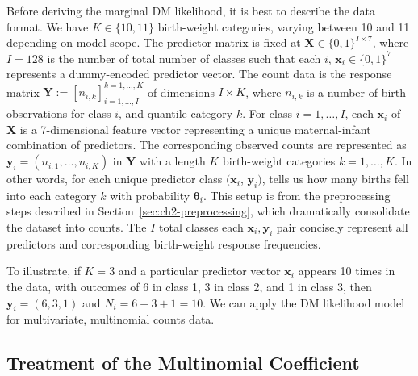 Before deriving the marginal DM likelihood, it is best to describe the data format. We have \(K\in\{10,11\}\) birth-weight categories, varying between 10 and 11 depending on model scope. The predictor matrix is fixed at \(\mathbf{X} \in \{0,1\}^{I \times 7}\), where \(I=128\) is the number of total number of classes such that each \(i\), \(\mathbf{x}_i \in \{0,1\}^7\) represents a dummy-encoded predictor vector. The count data is the response matrix \(\mathbf{Y} := [n_{i,k}]_{i=1,\dots,I}^{k = 1,\dots,K}\) of dimensions \(I \times K\), where \(n_{i,k}\) is a number of birth observations for class \(i\), and quantile category \(k\). For class \(i=1,\dots,I\), each \(\mathbf{x}_i\) of \(\mathbf{X}\) is a 7-dimensional feature vector representing a unique maternal-infant combination of predictors. The corresponding observed counts are represented as \(\mathbf{y}_i =(n_{i,1}, \dots, n_{i,K}) \) in \(\mathbf{Y}\) with a length \(K\) birth-weight categories \(k = 1, \dots, K\). In other words, for each unique predictor class \((\mathbf{x}_i\), \(\mathbf{y}_i)\), tells us how many births fell into each category \(k\) with probability \(\boldsymbol{\theta}_i\). This setup is from the preprocessing steps described in Section~\ref{sec:ch2-preprocessing}, which dramatically consolidate the dataset into counts. The \(I\) total classes each \(\mathbf{x}_i, \mathbf{y}_i\) pair concisely represent all predictors and corresponding birth-weight response frequencies.

To illustrate, if \(K=3\) and a particular predictor vector \(\mathbf{x}_i\) appears 10 times in the data, with outcomes of 6 in class 1, 3 in class 2, and 1 in class 3, then \(\mathbf{y}_i = (6,3,1)\) and \(N_i = 6 + 3 + 1 = 10\). We can apply the DM likelihood model for multivariate, multinomial counts data.

\subsection{Treatment of the Multinomial Coefficient}
\label{sec:ch2-likelihood-adjustment}

